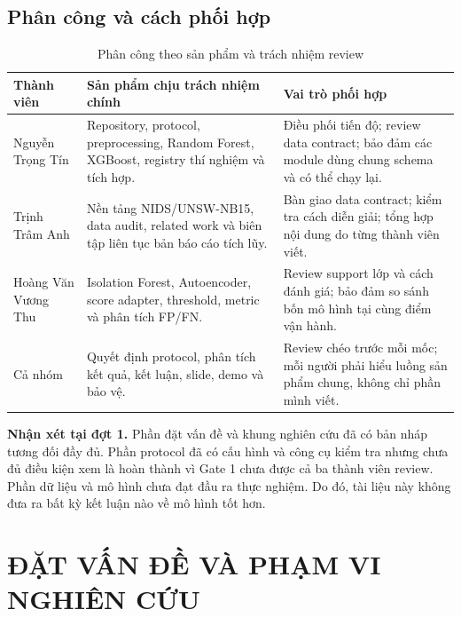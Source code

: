 \documentclass[12pt,a4paper,oneside]{report}
\begin{document}
\section*{Phân công và cách phối hợp}

\begin{table}[H]
\centering
\caption{Phân công theo sản phẩm và trách nhiệm review}
\label{tab:assignment}
\renewcommand{\arraystretch}{1.5}
\begin{tabularx}{\textwidth}{L{3.1cm}Y Y}
\toprule
\textbf{Thành viên} & \textbf{Sản phẩm chịu trách nhiệm chính} & \textbf{Vai trò phối hợp} \\
\midrule
Nguyễn Trọng Tín & Repository, protocol, preprocessing, Random Forest, XGBoost, registry thí nghiệm và tích hợp. & Điều phối tiến độ; review data contract; bảo đảm các module dùng chung schema và có thể chạy lại. \\
Trịnh Trâm Anh & Nền tảng NIDS/UNSW-NB15, data audit, related work và biên tập liên tục bản báo cáo tích lũy. & Bàn giao data contract; kiểm tra cách diễn giải; tổng hợp nội dung do từng thành viên viết. \\
Hoàng Văn Vương Thu & Isolation Forest, Autoencoder, score adapter, threshold, metric và phân tích FP/FN. & Review support lớp và cách đánh giá; bảo đảm so sánh bốn mô hình tại cùng điểm vận hành. \\
Cả nhóm & Quyết định protocol, phân tích kết quả, kết luận, slide, demo và bảo vệ. & Review chéo trước mỗi mốc; mỗi người phải hiểu luồng sản phẩm chung, không chỉ phần mình viết. \\
\bottomrule
\end{tabularx}
\end{table}

\noindent\textbf{Nhận xét tại đợt 1.} Phần đặt vấn đề và khung nghiên cứu đã có bản nháp tương đối đầy đủ. Phần protocol đã có cấu hình và công cụ kiểm tra nhưng chưa đủ điều kiện xem là hoàn thành vì Gate 1 chưa được cả ba thành viên review. Phần dữ liệu và mô hình chưa đạt đầu ra thực nghiệm. Do đó, tài liệu này không đưa ra bất kỳ kết luận nào về mô hình tốt hơn.

\clearpage
{}
\setcounter{page}{1}

\chapter{ĐẶT VẤN ĐỀ VÀ PHẠM VI NGHIÊN CỨU}
\end{document}
